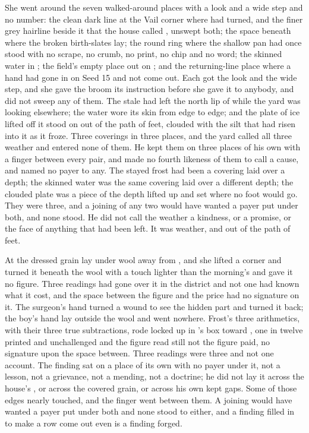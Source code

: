 She went around the seven walked-around places with a look and a wide step and no number: the clean dark line at the Vail corner where  had turned, and the finer grey hairline beside it that the house called , unswept both; the space beneath  where the broken birth-slates lay; the round ring where the shallow pan had once stood with no scrape, no crumb, no print, no chip and no word; the skinned water in ; the field's empty place out on ; and the returning-line place where a hand had gone in on Seed 15 and not come out. Each got the look and the wide step, and she gave the broom its instruction before she gave it to anybody, and did not sweep any of them. The stale  had left the north lip of  while the yard was looking elsewhere; the water wore its skin from edge to edge; and the plate of ice lifted off it stood on  out of the path of feet, clouded with the silt that had risen into it as it froze. Three coverings in three places, and the yard called all three weather and entered none of them. He kept them on three places of his own with a finger between every pair, and made no fourth likeness of them to call a cause, and named no payer to any. The stayed frost had been a covering laid over a depth; the skinned water was the same covering laid over a different depth; the clouded plate was a piece of the depth lifted up and set where no foot would go. They were three, and a joining of any two would have wanted a payer put under both, and none stood. He did not call the weather a kindness, or a promise, or the face of anything that had been left. It was weather, and out of the path of feet.

At  the dressed grain lay under wool away from , and she lifted a corner and turned it beneath the wool with a touch lighter than the morning's and gave it no figure. Three readings had gone over it in the district and not one had known what it cost, and the space between the figure and the price had no signature on it. The surgeon's hand turned a wound to see the hidden part and turned it back; the boy's hand lay outside the wool and went nowhere. Frost's three arithmetics, with their three true subtractions, rode locked up  in 's box toward , one in twelve printed and unchallenged and the figure read still not the figure paid, no signature upon the space between. Three readings were three and not one account. The finding sat on a place of its own with no payer under it, not a lesson, not a grievance, not a mending, not a doctrine; he did not lay it across the house's , or across the covered grain, or across his own kept gaps. Some of those edges nearly touched, and the finger went between them. A joining would have wanted a payer put under both and none stood to either, and a finding filled in to make a row come out even is a finding forged.

